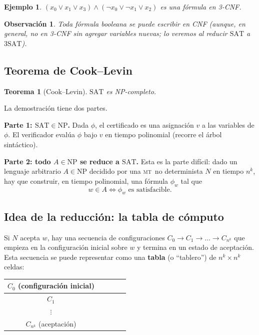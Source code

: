 \documentclass[11pt,a4paper]{article}
\theoremstyle{definicion}
\newtheorem{teorema}[definicion]{Teorema}
\newtheorem{ejemplo}[definicion]{Ejemplo}
\newtheorem{observacion}[definicion]{Observación}
\newcommand{\MT}{\textsc{mt}}
\newcommand{\NP}{\mathrm{NP}}
\begin{document}
\begin{ejemplo}
$(x_0 \lor x_1 \lor x_3) \land (\neg x_0 \lor \neg x_1 \lor x_2)$ es una fórmula en 3-CNF.
\end{ejemplo}

\begin{observacion}
Toda fórmula booleana se puede escribir en CNF (aunque, en general, no en 3-CNF sin agregar variables nuevas; lo veremos al reducir $\mathrm{SAT}$ a $3\mathrm{SAT}$).
\end{observacion}

\subsection{Teorema de Cook--Levin}

\begin{teorema}[Cook--Levin]\label{teo:cook-levin}
$\mathrm{SAT}$ es NP-completo.
\end{teorema}

La demostración tiene dos partes.

\textbf{Parte 1: $\mathrm{SAT} \in \NP$.}\quad
Dada $\phi$, el certificado es una asignación $v$ a las variables de $\phi$. El verificador evalúa $\phi$ bajo $v$ en tiempo polinomial (recorre el árbol sintáctico).

\textbf{Parte 2: todo $A \in \NP$ se reduce a $\mathrm{SAT}$.}\quad
Esta es la parte difícil: dado un lenguaje arbitrario $A \in \NP$ decidido por una \MT\ no determinista $N$ en tiempo $n^k$, hay que construir, en tiempo polinomial, una fórmula $\phi_w$ tal que
\[
w \in A \iff \phi_w \text{ es satisfacible}.
\]

\subsection{Idea de la reducción: la tabla de cómputo}

Si $N$ acepta $w$, hay una secuencia de configuraciones $C_0 \to C_1 \to \dots \to C_{n^k}$ que empieza en la configuración inicial sobre $w$ y termina en un estado de aceptación. Esta secuencia se puede representar como una \textbf{tabla} (o ``tablero'') de $n^k \times n^k$ celdas:

\begin{center}
\begin{tabular}{|c|c|c|c|c|}
\hline
$C_0$ (configuración inicial) & & & & \\
\hline
$C_1$ & & & & \\
\hline
$\vdots$ & & & & \\
\hline
$C_{n^k}$ (aceptación) & & & & \\
\hline
\end{tabular}
\end{center}
\end{document}
